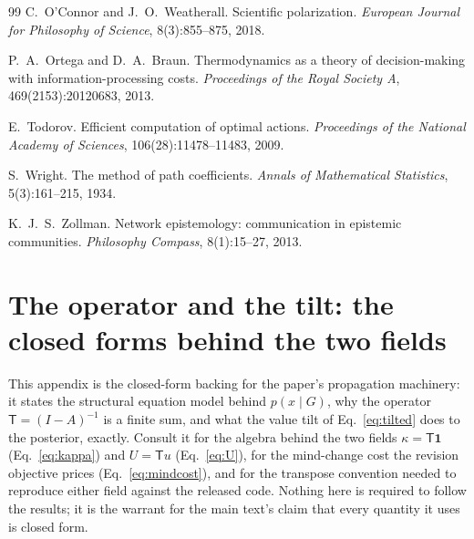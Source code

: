 \documentclass[runningheads]{llncs}
\newcommand{\Top}{\mathsf{T}}          %
\newcommand{\bone}{\mathbf{1}}         %
\begin{document}
\begin{thebibliography}{99}
C.~O'Connor and J.~O.~Weatherall.
Scientific polarization. \emph{European Journal for Philosophy of Science}, 8(3):855--875, 2018.

P.~A.~Ortega and D.~A.~Braun.
Thermodynamics as a theory of decision-making with information-processing costs.
\emph{Proceedings of the Royal Society A}, 469(2153):20120683, 2013.

E.~Todorov.
Efficient computation of optimal actions.
\emph{Proceedings of the National Academy of Sciences}, 106(28):11478--11483, 2009.

S.~Wright.
The method of path coefficients. \emph{Annals of Mathematical Statistics}, 5(3):161--215, 1934.

K.~J.~S.~Zollman.
Network epistemology: communication in epistemic communities.
\emph{Philosophy Compass}, 8(1):15--27, 2013.

\end{thebibliography}

\clearpage
\appendix
\section{The operator and the tilt: the closed forms behind the two fields}
\label{app:operator}

This appendix is the closed-form backing for the paper's propagation machinery: it states
the structural equation model behind $p(x\mid G)$, why the operator $\Top=(I-A)^{-1}$ is a
finite sum, and what the value tilt of Eq.~\eqref{eq:tilted} does to the posterior, exactly.
Consult it for the algebra behind the two fields $\kappa=\Top\bone$ (Eq.~\ref{eq:kappa}) and
$U=\Top u$ (Eq.~\ref{eq:U}), for the mind-change cost the revision objective prices
(Eq.~\ref{eq:mindcost}), and for the transpose convention needed to reproduce either field
against the released code. Nothing here is required to follow the results; it is the warrant
for the main text's claim that every quantity it uses is closed form.
\end{document}
